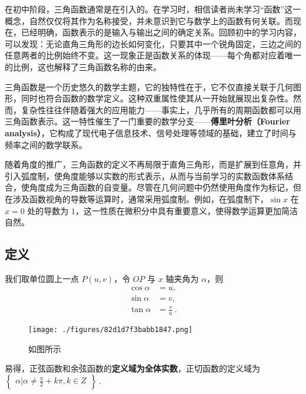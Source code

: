 \begin{issues}
\issueDraft
\end{issues}

在初中阶段，三角函数通常是在引入的。在学习时，相信读者尚未学习“函数”这一概念，自然仅仅将其作为名称接受，并未意识到它与数学上的函数有何关联。而现在，已经明确，函数表示的是输入与输出之间的确定关系。回顾初中的学习内容，可以发现：无论直角三角形的边长如何变化，只要其中一个锐角固定，三边之间的任意两者的比例始终不变。这一现象正是函数关系的体现——每个角都对应着唯一的比例，这也解释了三角函数名称的由来。

三角函数是一个历史悠久的数学主题，它的独特性在于，它不仅直接关联于几何图形，同时也符合函数的数学定义。这种双重属性使其从一开始就展现出复杂性。然而，复杂性往往伴随着强大的应用能力——事实上，几乎所有的周期函数都可以用三角函数表示。这一特性催生了一门重要的数学分支——\textbf{傅里叶分析（Fourier analysis）}，它构成了现代电子信息技术、信号处理等领域的基础，建立了时间与频率之间的数学联系。

随着角度的推广，三角函数的定义不再局限于直角三角形，而是扩展到任意角，并引入弧度制，使角度能够以实数的形式表示，从而与当前学习的实数函数体系结合，使角度成为三角函数的自变量。尽管在几何问题中仍然使用角度作为标记，但在涉及函数视角的导数等运算时，通常采用弧度制。例如，在弧度制下，$\sin x$ 在 $x=0$ 处的导数为 $1$，这一性质在微积分中具有重要意义，使得数学运算更加简洁自然。

\subsection{定义}
我们取单位圆上一点 $P(u,v)$，令 $OP$ 与 $x$ 轴夹角为 $\alpha$，则 
\begin{equation}
\begin{aligned}
\cos\alpha &= u,\\
\sin\alpha &= v,\\
\tan\alpha &= \frac{v}{u}~.
\end{aligned}
\end{equation}
\begin{figure}[ht]
\centering
\texttt{[image: ./figures/82d1d7f3babb1847.png]}
\caption{如图所示} \label{fig_HsTrFu_3}
\end{figure}
易得，正弦函数和余弦函数的\textbf{定义域为全体实数}，正切函数的定义域为 $\begin{Bmatrix}\alpha|\alpha \neq \frac{\pi}{2}+k\pi,k\in Z\end{Bmatrix}~.$

